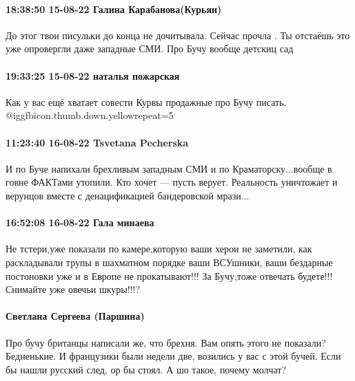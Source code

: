  
 
 
 
 

\paragraph{18:38:50 15-08-22 Галина Карабанова(Курьян)}

До этог твои писульки до конца не дочитывала. Сейчас прочла . Ты отстаёшь это
уже опровергли даже западные СМИ. Про Бучу вообще детскиц сад

\paragraph{19:33:25 15-08-22 наталья пожарская}

Как у вас ещё хватает совести Курвы продажные про Бучу писать. @igg{fbicon.thumb.down.yellow}{repeat=5} 

\paragraph{11:23:40 16-08-22 Tsvetana Pecherska}

\obeycr
И по Буче напихали брехливым западным СМИ и по Краматорску...вообще в говне ФАКТами утопили.
Кто хочет — пусть верует.
Реальность уничтожает и верунцов вместе с денацификацией бандеровской мрази...
\restorecr

\paragraph{16:52:08 16-08-22 Гала минаева}

Не тстери,уже показали по камере,которую ваши херои не заметили, как
раскладывали трупы в шахматном порядке ваши ВСУшники, ваши бездарные постоновки
уже и в Европе не прокатывают!!! За Бучу,тоже отвечать будете!!! Снимайте уже
овечьи шкуры!!!?

\paragraph{Светлана Сергеева (Паршина)}

Про бучу британцы написали же, что брехня. Вам опять этого не показали?
Бедненькие. И французики были недели две, возились у вас с этой бучей. Если бы
нашли русский след, ор бы стоял. А шо такое, почему молчат?


